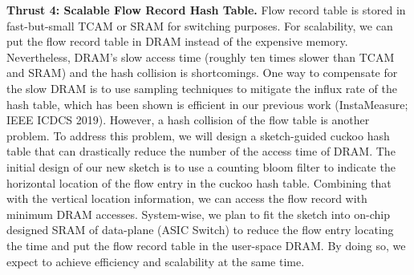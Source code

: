 \documentclass{NSF}
\newcommand{\BfPara}[1]{{\noindent\textbf{#1.}}\xspace}
\begin{document}
\BfPara{Thrust 4: Scalable Flow Record Hash Table} 
Flow record table is stored in fast-but-small TCAM or SRAM for switching purposes. 
For scalability, we can put the flow record table in DRAM instead of the expensive memory. 
Nevertheless, DRAM's slow access time
(roughly ten times slower than TCAM and SRAM) and the hash collision is shortcomings. One way to compensate for the slow DRAM is to use sampling techniques to mitigate the influx rate of the hash table, which has been shown is efficient in our previous work (InstaMeasure; IEEE ICDCS 2019). However, a hash collision of the flow table is another problem. 
To address this problem, we will design a sketch-guided cuckoo hash table that can drastically reduce the number of the access time of DRAM. The initial design of our new sketch is to use a counting bloom filter to indicate the horizontal location of the flow entry in the cuckoo hash table. Combining that with the vertical location information, we can access the flow record with minimum DRAM accesses. 
System-wise, we plan to fit the sketch into on-chip designed SRAM of data-plane (ASIC Switch) to reduce the flow entry locating the time and put the flow record table in the user-space DRAM. By doing so, we expect to achieve efficiency and scalability at the same time. 

   
 
\end{document}
